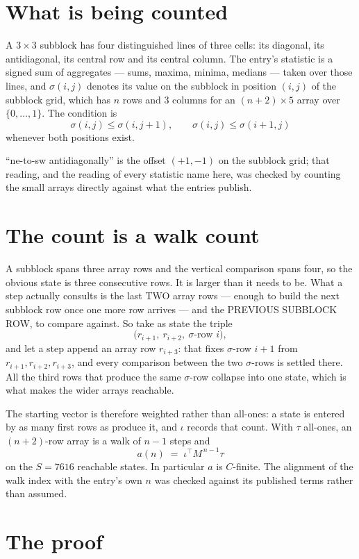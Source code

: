 \documentclass[11pt,a4paper]{article}
\theoremstyle{plain}
\theoremstyle{definition}
\begin{document}
\section{What is being counted}

A $3\times3$ subblock has four distinguished lines of three cells: its diagonal, its
antidiagonal, its central row and its central column. The entry's statistic is a signed sum of
aggregates --- sums, maxima, minima, medians --- taken over those lines, and $\sigma(i,j)$
denotes its value on the subblock in position $(i,j)$ of the subblock grid, which has $n$ rows
and $3$ columns for an $(n+2)\times5$ array over $\{0,\dots,1\}$. The condition is
\[
\sigma(i,j)\le\sigma(i,j+1),\qquad \sigma(i,j)\le\sigma(i+1,j)
\]
whenever both positions exist.

``ne-to-sw antidiagonally'' is the offset $(+1,-1)$ on the subblock grid; that reading, and
the reading of every statistic name here, was checked by counting the small arrays directly
against what the entries publish.

\section{The count is a walk count}

A subblock spans three array rows and the vertical comparison spans four, so the obvious state
is three consecutive rows. It is larger than it needs to be. What a step actually consults is
the last TWO array rows --- enough to build the next subblock row once one more row arrives ---
and the PREVIOUS SUBBLOCK ROW, to compare against. So take as state the triple
\[
\bigl(r_{i+1},\ r_{i+2},\ \sigma\text{-row }i\bigr),
\]
and let a step append an array row $r_{i+3}$: that fixes $\sigma$-row $i+1$ from
$r_{i+1},r_{i+2},r_{i+3}$, and every comparison between the two $\sigma$-rows is settled
there. All the third rows that produce the same $\sigma$-row collapse into one state, which is
what makes the wider arrays reachable.

The starting vector is therefore weighted rather than all-ones: a state is entered by as many
first rows as produce it, and $\iota$ records that count. With $\tau$ all-ones, an
$(n+2)$-row array is a walk of $n-1$ steps and
\[
a(n)\;=\;\iota^{\!\top}M^{\,n-1}\tau
\]
on the $S=7616$ reachable states. In particular $a$ is $C$-finite. The alignment of the walk
index with the entry's own $n$ was checked against its published terms rather than assumed.

\section{The proof}
\end{document}
